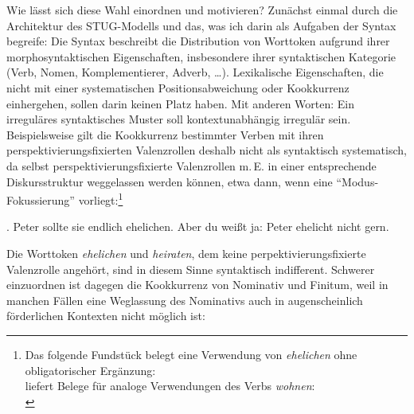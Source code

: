 {Wie lässt sich diese Wahl einordnen und motivieren? Zunächst einmal durch die Architektur des STUG-Modells und das, was ich darin als Aufgaben der Syntax begreife: Die Syntax beschreibt die Distribution von Worttoken aufgrund ihrer morphosyntaktischen Eigenschaften, insbesondere ihrer syntaktischen Kategorie (Verb, Nomen, Komplementierer, Adverb, \ldots). Lexikalische Eigenschaften, die nicht mit einer systematischen Positionsabweichung oder Kookkurrenz einhergehen, sollen darin keinen Platz haben. Mit anderen Worten: Ein irreguläres syntaktisches Muster soll kontextunabhängig irregulär sein. Beispielsweise gilt die Kookkurrenz bestimmter Verben mit ihren perspektivierungsfixierten Valenzrollen deshalb nicht als syntaktisch systematisch, da selbst perspektivierungsfixierte Valenzrollen m.\,E. in einer entsprechende Diskursstruktur weggelassen werden können, etwa dann, wenn eine "`Modus-Fokussierung"' \citep{Maienborn:91} vorliegt:\footnote{Das folgende Fundstück belegt eine Verwendung von {\it ehelichen} ohne obligatorischer Ergänzung:\\
\citet[24, Fußnote~14]{Mueller:10} liefert Belege für analoge Verwendungen des Verbs {\it wohnen}:\\
}   

\ex. Peter sollte sie endlich ehelichen. Aber du wei\ss t ja: Peter ehelicht nicht gern. 

Die Worttoken {\it ehelichen} und {\it heiraten}, dem keine perpektivierungsfixierte Valenzrolle angehört, sind in diesem Sinne syntaktisch indifferent. Schwerer einzuordnen ist dagegen die Kookkurrenz von Nominativ und Finitum, weil in manchen Fällen eine Weglassung des Nominativs auch in augenscheinlich förderlichen Kontexten nicht möglich ist:

}

